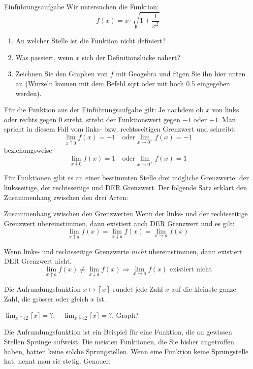 \begin{LA}{Einführungsaufgabe}{}
    Wir untersuchen die Funktion:
    $$f(x) = x\cdot \sqrt{1+\frac{1}{x^2}}$$

    \begin{enumerate}
        \item An welcher Stelle ist die Funktion nicht definiert?
        \item Was passiert, wenn $x$ sich der Definitionslücke nähert?
        \item Zeichnen Sie den Graphen von $f$ mit Geogebra und fügen Sie ihn hier unten an (Wurzeln können mit dem Befehl \glqq sqrt\grqq{} oder mit \glqq hoch 0.5\grqq{} eingegeben werden). 
    \end{enumerate}
\end{LA}
\clearpage
Für die Funktion aus der Einführungsaufgabe gilt: Je nachdem ob $x$ von links oder rechts gegen $0$ strebt, strebt der Funktionswert gegen $-1$ oder $+1$. Man spricht in diesem Fall vom links- bzw. rechtsseitigen Grenzwert und schreibt:
$$\lim_{x\uparrow 0} f(x) = -1 \quad \mathrm{oder}  \lim_{x\rightarrow 0^-} f(x) = -1 $$
beziehungsweise
$$\lim_{x\downarrow 0} f(x) = 1 \quad \mathrm{oder}  \lim_{x\rightarrow 0^+} f(x) = 1 $$

Für Funktionen gibt es an einer bestimmten Stelle drei mögliche Grenzwerte: der linksseitige, der rechtsseitige und DER Grenzwert. Der folgende Satz erklärt den Zusammenhang zwischen den drei Arten:

\begin{satz}{Zusammenhang zwischen den Grenzwerten}{}
Wenn der links- und der rechtsseitige Grenzwert übereinstimmen, dann existiert auch DER Grenzwert und es gilt:
$$\lim_{x\uparrow a} f(x) = \lim_{x\downarrow a} f(x) = \lim_{x\rightarrow a} f(x) $$

Wenn links- und rechtsseitige Grenzwerte \emph{nicht} übereinstimmen, dann existiert DER Grenzwert nicht.
$$\lim_{x\uparrow a} f(x) \neq \lim_{x\downarrow a} f(x) \Rightarrow  \lim_{x\rightarrow a} f(x) \text{ existiert nicht}$$
\end{satz}

\begin{bsp}
    {}{}
    Die Aufrundungsfunktion $x\mapsto \left \lceil{x}\right \rceil $ rundet jede Zahl $x$ auf die kleinste ganze Zahl, die grösser oder gleich $x$ ist.

    $\lim_{x\uparrow 42} \lceil x\rceil = ? , \quad \lim_{x\downarrow 42} \lceil x\rceil = ? $, Graph?
    
    \vspace{9cm}
\end{bsp}
\clearpage
Die Aufrundungsfunktion ist ein Beispiel für eine Funktion, die an gewissen Stellen Sprünge aufweist. Die meisten Funktionen, die Sie bisher angetroffen haben, hatten keine solche Sprungstellen. Wenn eine Funktion keine Sprungstelle hat, nennt man sie stetig. Genauer:

